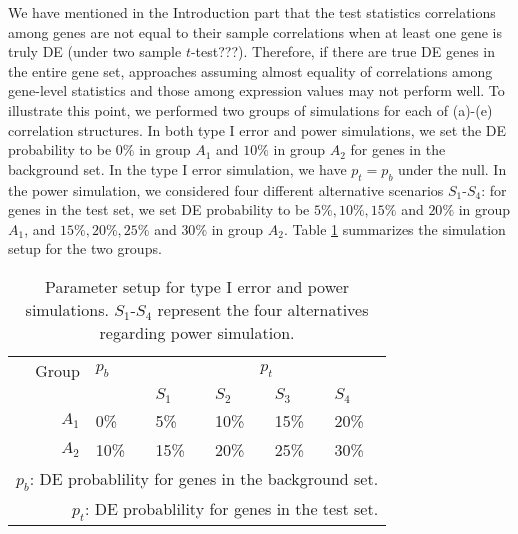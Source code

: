 \documentclass[useAMS,usenatbib, galley]{biom}
\newcommand{\aaCase}{a}
\newcommand{\fCase}{e}
\begin{document}
	 	 We have mentioned in the Introduction part that the test statistics correlations among genes are not equal to their sample correlations when at least one gene is truly DE (under two sample $t$-test???). Therefore, if there are true DE genes in the entire gene set, approaches assuming almost equality of correlations among gene-level statistics and those among expression values may not perform well. To illustrate this point, we performed two groups of simulations for each of  (\aaCase)-(\fCase) correlation structures. In both type I error and power simulations, we set the DE probability to be $0\%$ in group $A_1$ and $10\%$ in group $A_2$ for genes in the background set. In the type I error simulation, we have $p_t = p_b$ under the null. In the power simulation, we considered four different alternative scenarios $S_1$-$S_4$: for genes in the test set, we set DE probability to be $5\%, 10\%, 15\%$ and $20\%$ in group $A_1$, and $15\%, 20\%, 25\%$ and $30\%$ in group $A_2$. Table \ref{table:simusetup} summarizes the simulation setup for the two groups.
	 	 
	 	 
	 	 
	 	 
	 	 \begin{table}[!ht]
	 	 	\centering
	 	 		\caption{Parameter setup for type I error and power simulations. $S_1$-$S_4$ represent the four alternatives regarding power simulation.}
	 	 	\begin{tabular}{rp{1cm}p{1cm}p{1cm}p{1cm}p{1cm}}
	 	 		\hline\hline
	 	 		Group & $p_b$ &  \multicolumn{4}{c}{$p_t$}  \\ 
	 	 		\cline{3-6}
	 	 		  &   & $S_1$ & $S_2$ & $S_3$ & $S_4$\\ 
	 	 	\hline
	 	 		$A_1$ & 0\%   & 5\% & 10\% & 15\% & 20\%\\ 
	 	 		$A_2$ & 10\%  & 15\%& 20\%& 25\% & 30\%\\ 
	 	 		\hline\hline
	 	 			\multicolumn{6}{p{8cm}}{$p_b$: DE probablility for genes in the background set. }	 \\	
	 	 			\multicolumn{6}{p{8cm}}{$p_t$: DE probablility for genes in the test set. }	 \\	
	 	 	\end{tabular}
	 	 	\label{table:simusetup}
	 	 \end{table}
	 	 
\end{document}
